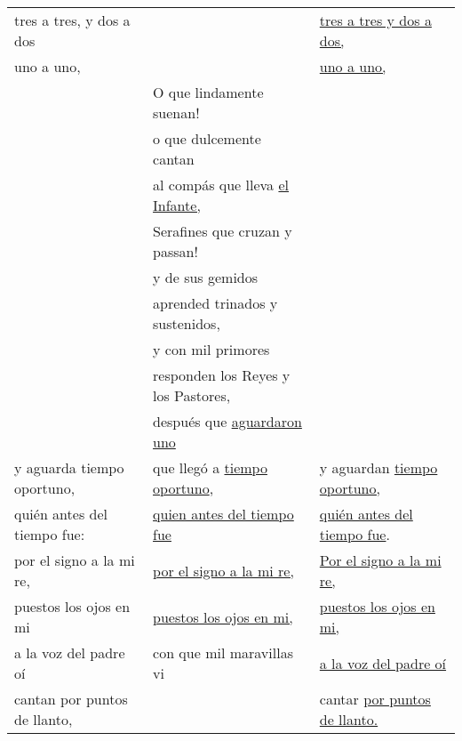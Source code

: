 \documentclass{aac-table}
\begin{document}
\begin{longtable}{lll}
    tres a tres, y dos a dos &
    &
    \uline{tres a tres y dos a dos,} \\

    uno a uno, &
    &
    \uline{uno a uno,} \\
    
    & 
    O que lindamente suenan! 
    & \\
    
    & 
    o que dulcemente cantan 
    & \\
    
    & 
    al compás que lleva \uline{el Infante,} 
    & \\
    
    & 
    Serafines que cruzan y passan! 
    & \\
    
    & 
    y de sus gemidos 
    & \\
    
    & 
    aprended trinados y sustenidos, 
    & \\
    
    & 
    y con mil primores 
    & \\ 
    
    & 
    responden los Reyes y los Pastores, 
    & \\
 
    & 
    después que \uline{aguardaron uno} 
    & \\

    y aguarda tiempo oportuno, &
    que llegó a \uline{tiempo oportuno}, &
    y aguardan \uline{tiempo oportuno,} \\ 
    
    quién antes del tiempo fue: &
    \uline{quien antes del tiempo fue} &
    \uline{quién antes del tiempo fue}. \\

    por el signo a la mi re, &
    \uline{por el signo a la mi re,} &
    \uline{Por el signo a la mi re,} \\

    puestos los ojos en mi &
    \uline{puestos los ojos en mi,} &
    \uline{puestos los ojos en mi,} \\

    a la voz del padre oí &
    con que mil maravillas vi &
    \uline{a la voz del padre oí} \\

    cantan por puntos de llanto, &
    &
    cantar \uline{por puntos de llanto.} \\


\end{longtable}
\end{document}

